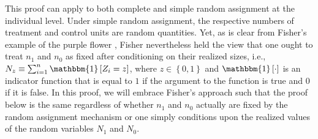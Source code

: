 \documentclass[12pt,leqno]{article}
\theoremstyle{newstyle}
\begin{document}
This proof can apply to both complete and simple random assignment at the individual level. Under simple random assignment, the respective numbers of treatment and control units are random quantities. Yet, as is clear from Fisher's example of the purple flower \citep[see][]{little1989,upton1992}, Fisher nevertheless held the view that one ought to treat $n_1$ and $n_0$ as fixed after conditioning on their realized sizes, i.e., $N_z \equiv \sum_{i = 1}^n \mathbbm{1}\left[Z_i = z\right]$, where $z \in \left\{0, 1\right\}$ and $\mathbbm{1}\left[\cdot\right]$ is an indicator function that is equal to $1$ if the argument to the function is true and $0$ if it is false. In this proof, we will embrace Fisher's approach such that the proof below is the same regardless of whether $n_1$ and $n_0$ actually are fixed by the random assignment mechanism or one simply conditions upon the realized values of the random variables $N_1$ and $N_0$.
\end{document}
